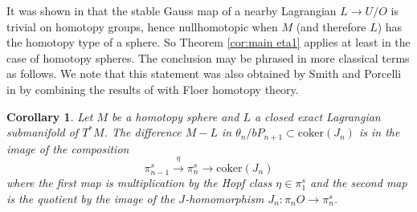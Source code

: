 \documentclass[reqno]{amsart}
\theoremstyle{theorem}
\newtheorem{corollary}{Corollary}[section]
\theoremstyle{remark}
\newtheorem{remark}[corollary]{Remark}
\theoremstyle{definition}
\newcommand{\T}{\mathcal{T}}
\newcommand{\QQ}{\mathcal{Q}}
\begin{document}
It was shown in \cite{ACGK} that the stable Gauss map of a nearby Lagrangian $L \to U/O$ is trivial on homotopy groups, hence nullhomotopic when $M$ (and therefore $L$) has the homotopy type of a sphere. So Theorem \ref{cor:main eta1} applies at least in the case of homotopy spheres. The conclusion may be phrased in more classical terms as follows. We note that this statement was also obtained by Smith and Porcelli in \cite{PS24}  by combining the results of \cite{ACGK} with Floer homotopy theory.



\begin{corollary}\label{cor:main eta2}
Let $M$ be a homotopy sphere and $L$ a closed exact Lagrangian submanifold of $T^*M$. The difference $M-L$ in $\theta_n/bP_{n+1} \subset \text{coker}(J_n)$ is in the image of the composition $$\pi^s_{n-1} \xrightarrow{\eta} \pi^s_n \to \text{coker}(J_n)$$ where the first map is multiplication by the Hopf class $\eta \in \pi^s_1$ and the second map is the quotient by the image of the $J$-homomorphism $J_n:\pi_nO \to \pi_n^s$. 
\end{corollary}






\end{document}
